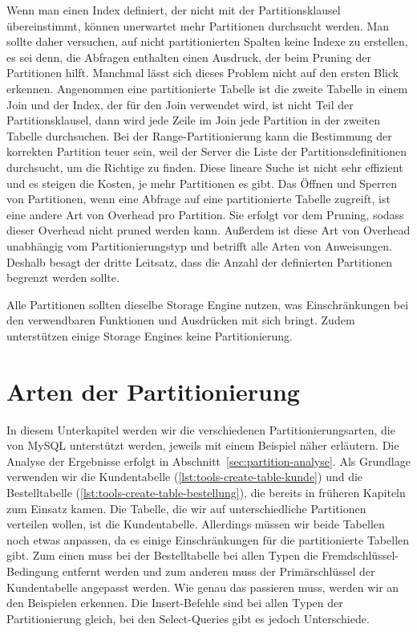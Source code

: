 Wenn man einen Index definiert, der nicht mit der Partitionsklausel übereinstimmt, können unerwartet mehr Partitionen durchsucht werden.
Man sollte daher versuchen, auf nicht partitionierten Spalten keine Indexe zu erstellen, es sei denn, die Abfragen enthalten einen Ausdruck, der beim Pruning der Partitionen hilft.
Manchmal lässt sich dieses Problem nicht auf den ersten Blick erkennen.
Angenommen eine partitionierte Tabelle ist die zweite Tabelle in einem Join und der Index, der für den Join verwendet wird, ist nicht Teil der Partitionsklausel, dann wird jede Zeile im Join jede Partition in der zweiten Tabelle durchsuchen.
Bei der Range-Partitionierung kann die Bestimmung der korrekten Partition teuer sein, weil der Server die Liste der Partitionsdefinitionen durchsucht, um die Richtige zu finden.
Diese lineare Suche ist nicht sehr effizient und es steigen die Kosten, je mehr Partitionen es gibt.
Das Öffnen und Sperren von Partitionen, wenn eine Abfrage auf eine partitionierte Tabelle zugreift, ist eine andere Art von Overhead pro Partition.
Sie erfolgt vor dem Pruning, sodass dieser Overhead nicht pruned werden kann.
Außerdem ist diese Art von Overhead unabhängig vom Partitionierungstyp und betrifft alle Arten von Anweisungen.
Deshalb besagt der dritte Leitsatz, dass die Anzahl der definierten Partitionen begrenzt werden sollte.

Alle Partitionen sollten dieselbe Storage Engine nutzen, was Einschränkungen bei den verwendbaren Funktionen und Ausdrücken mit sich bringt.
Zudem unterstützen einige Storage Engines keine Partitionierung.

\section{Arten der Partitionierung}\label{sec:arten-der-partitionierung}

In diesem Unterkapitel werden wir die verschiedenen Partitionierungsarten, die von MySQL unterstützt werden, jeweils mit einem Beispiel näher erläutern.
Die Analyse der Ergebnisse erfolgt in Abschnitt~\ref{sec:partition-analyse}.
Als Grundlage verwenden wir die Kundentabelle (\ref{lst:tools-create-table-kunde}) und die Bestelltabelle (\ref{lst:tools-create-table-bestellung}), die bereits in früheren Kapiteln zum Einsatz kamen.
Die Tabelle, die wir auf unterschiedliche Partitionen verteilen wollen, ist die Kundentabelle.
Allerdings müssen wir beide Tabellen noch etwas anpassen, da es einige Einschränkungen für die partitionierte Tabellen gibt.
Zum einen muss bei der Bestelltabelle bei allen Typen die Fremdschlüssel-Bedingung entfernt werden und zum anderen muss der Primärschlüssel der Kundentabelle angepasst werden.
Wie genau das passieren muss, werden wir an den Beispielen erkennen.
Die Insert-Befehle sind bei allen Typen der Partitionierung gleich, bei den Select-Queries gibt es jedoch Unterschiede.

